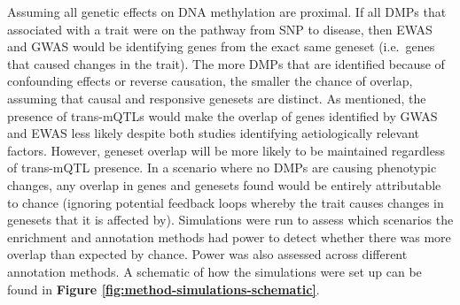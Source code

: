 \documentclass[11pt,oneside]{bristolthesis}
\begin{document}
Assuming all genetic effects on DNA methylation are proximal. If all DMPs that associated with a trait were on the pathway from SNP to disease, then EWAS and GWAS would be identifying genes from the exact same geneset (i.e.~genes that caused changes in the trait). The more DMPs that are identified because of confounding effects or reverse causation, the smaller the chance of overlap, assuming that causal and responsive genesets are distinct. As mentioned, the presence of trans-mQTLs would make the overlap of genes identified by GWAS and EWAS less likely despite both studies identifying aetiologically relevant factors. However, geneset overlap will be more likely to be maintained regardless of trans-mQTL presence. In a scenario where no DMPs are causing phenotypic changes, any overlap in genes and genesets found would be entirely attributable to chance (ignoring potential feedback loops whereby the trait causes changes in genesets that it is affected by). Simulations were run to assess which scenarios the enrichment and annotation methods had power to detect whether there was more overlap than expected by chance. Power was also assessed across different annotation methods. A schematic of how the simulations were set up can be found in \textbf{Figure \ref{fig:method-simulations-schematic}}.
\end{document}

